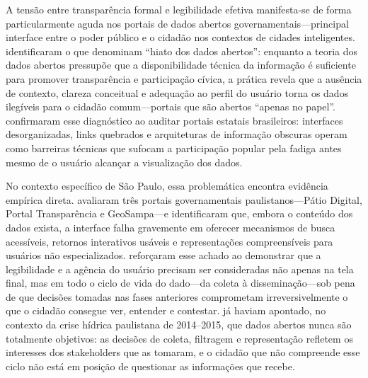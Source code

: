 \documentclass[
	12pt,				%
	oneside,			%
	a4paper,			%
	english,			%
	brazil				%
	]{abntex2ppgsi}
\begin{document}
    A tensão entre transparência formal e legibilidade efetiva manifesta-se de forma particularmente aguda nos portais de dados abertos governamentais---principal interface entre o poder público e o cidadão nos contextos de cidades inteligentes.  identificaram o que denominam ``hiato dos dados abertos'': enquanto a teoria dos dados abertos pressupõe que a disponibilidade técnica da informação é suficiente para promover transparência e participação cívica, a prática revela que a ausência de contexto, clareza conceitual e adequação ao perfil do usuário torna os dados ilegíveis para o cidadão comum---portais que são abertos ``apenas no papel''.  confirmaram esse diagnóstico ao auditar portais estatais brasileiros: interfaces desorganizadas, links quebrados e arquiteturas de informação obscuras operam como barreiras técnicas que sufocam a participação popular pela fadiga antes mesmo de o usuário alcançar a visualização dos dados.

    No contexto específico de São Paulo, essa problemática encontra evidência empírica direta.  avaliaram três portais governamentais paulistanos---Pátio Digital, Portal Transparência e GeoSampa---e identificaram que, embora o conteúdo dos dados exista, a interface falha gravemente em oferecer mecanismos de busca acessíveis, retornos interativos usáveis e representações compreensíveis para usuários não especializados.  reforçaram esse achado ao demonstrar que a legibilidade e a agência do usuário precisam ser consideradas não apenas na tela final, mas em todo o ciclo de vida do dado---da coleta à disseminação---sob pena de que decisões tomadas nas fases anteriores comprometam irreversivelmente o que o cidadão consegue ver, entender e contestar.  já haviam apontado, no contexto da crise hídrica paulistana de 2014--2015, que dados abertos nunca são totalmente objetivos: as decisões de coleta, filtragem e representação refletem os interesses dos stakeholders que as tomaram, e o cidadão que não compreende esse ciclo não está em posição de questionar as informações que recebe.
\end{document}
